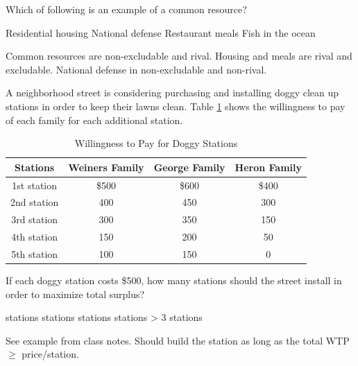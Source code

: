 \documentclass[addpoints,11pt]{exam}
\theoremstyle{definition}
\begin{document}
\begin{questions}
	
	\question Which of following is an example of a common resource?
	
	\begin{choices}
		\choice Residential housing
		\choice National defense 
		\choice Restaurant meals
		\CorrectChoice Fish in the ocean
	\end{choices}
	
	\begin{solution}
		Common resources are non-excludable and rival. Housing and meals are rival and excludable. National defense in non-excludable and non-rival.
	\end{solution}

	
	\question A neighborhood street is considering purchasing and installing doggy clean up stations in order to keep their lawns clean. Table \ref{MC15} shows the willingness to pay of each family for each additional station.
	
	\begin{table}[H]
		\caption{Willingness to Pay for Doggy Stations}
		\label{MC15}
		\centering
		\begin{tabular}{ c|c|c|c} 
			
			Stations & Weiners Family & George Family & Heron Family\\
			\hline
			1st station & \$500 & \$600 & \$400\\
			2nd station & 400 & 450 & 300\\
			3rd station & 300 & 350 & 150\\
			4th station & 150 & 200 & 50\\
			5th station & 100 & 150 & 0\\
		\end{tabular}
	\end{table}
	
	If each doggy station costs \$500, how many stations should the street install in order to maximize total surplus?
	
	\begin{choices}
		 stations
		 stations
		 stations
		 stations
		\choice > 3 stations
	\end{choices}

	\begin{solution}
		See example from class notes. Should build the station as long as the total WTP $\ge$ price/station.
	\end{solution}


\end{questions}
\end{document}
